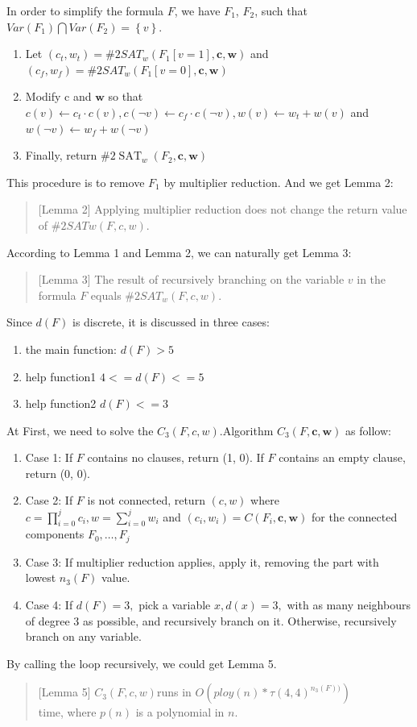 \documentclass{sigchi}
\begin{document}
In order to simplify the formula $F$, we have $F_{1}$, $F_{2}$, such that \\$Var(F_{1})\bigcap Var(F_2)=\left \{ v \right \} $.
\begin{enumerate} 
\item Let $\left(c_{t}, w_{t}\right)=\# 2 S A T_{w}\left(F_{1}[v=1], \mathbf{c}, \mathbf{w}\right)$ and $\left(c_{f}, w_{f}\right)=\# 2 S A T_{w}\left(F_{1}[v=0], \mathbf{c}, \mathbf{w}\right)$
\item Modify c and $\mathbf{w}$ so that $c(v) \leftarrow c_{t} \cdot c(v), c(\neg v) \leftarrow c_{f} \cdot c(\neg v), w(v) \leftarrow w_{t}+w(v)$ and
$w(\neg v) \leftarrow w_{f}+w(\neg v)$
\item Finally, return $\# 2 \operatorname{SAT}_{w}\left(F_{2}, \mathbf{c}, \mathbf{w}\right)$
\end{enumerate}
This procedure is to remove $F_1$ by multiplier reduction. And we get Lemma 2:
\begin{quote}[Lemma 2]
Applying multiplier reduction does not change the return value of $\#2SAT w (F, c, w)$.
\end{quote}

	According to Lemma 1 and Lemma 2, we can naturally get Lemma 3:
\begin{quote}[Lemma 3]
	The result of recursively branching on the variable $v$ in the formula $F$ equals $\#2SAT_{w}(F, c, w)$.
\end{quote}

Since $d(F)$ is discrete, it is discussed in three cases:
\begin{enumerate}
	\item the main function: $d(F)>5$
	\item help function1 $4<=d(F)<=5$
	\item help function2 $d(F)<=3$
\end{enumerate}
	At First, we need to solve the $C_{3}(F,c,w)$.Algorithm $C_{3}(F, \mathbf{c}, \mathbf{w})$ as follow:
\begin{enumerate}	
	\item Case 1: If $F$ contains no clauses, return (1, 0). If $F$ contains an empty clause, return (0, 0).\
	\item Case 2: If $F$ is not connected, return $(c, w)$ where $c=\prod_{i=0}^{j} c_{i}, w=\sum_{i=0}^{j} w_{i}$ and $\left(c_{i}, w_{i}\right)=C\left(F_{i}, \mathbf{c}, \mathbf{w}\right)$ for the connected components $F_{0}, \ldots, F_{j}$
	\item Case 3: If multiplier reduction applies, apply it, removing the part with lowest $n_{3}(F)$ value.
	\item Case 4: If $d(F)=3,$ pick a variable $x, d(x)=3,$ with as many neighbours of degree 3 as possible, and recursively branch on it. Otherwise, recursively branch on any variable.$  $
\end{enumerate}
By calling the loop recursively, we could get Lemma 5.
\begin{quote}[Lemma 5]
	$C_{3}(F ,c,w)$runs in $O(ploy(n)*\tau(4,4)^{n_{3}(F))})$\\time, where $p(n)$ is a polynomial in $n$.
\end{quote}
\end{document}
